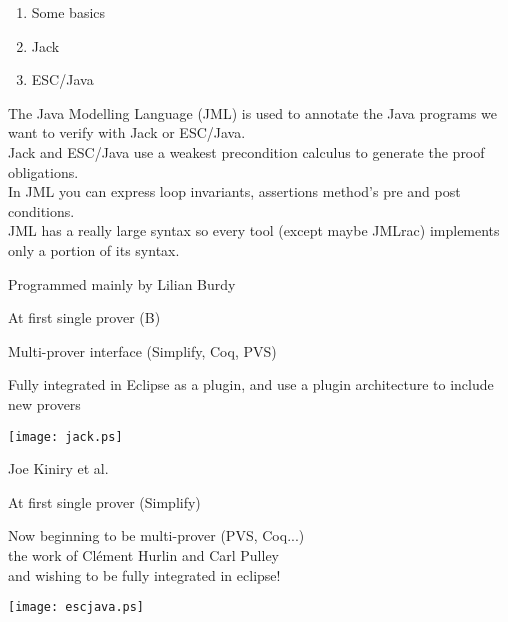 \begin{enumerate}
\item Some basics
\item Jack
\item ESC/Java
\end{enumerate}

\small
The {\purple Java Modelling Language} (JML)
is used to annotate the Java programs we want to verify with 
Jack or ESC/Java.\\
Jack and ESC/Java use a {\purple weakest precondition calculus} to generate
the proof obligations.\\
In JML you can express loop invariants, assertions method's
pre and post conditions.\\
JML has a really large syntax so every tool (except maybe JMLrac)
implements only a {\purple portion} of its syntax.


\small
\blist
\item Programmed mainly by Lilian Burdy
\item At first single prover (B)
\item Multi-prover interface (Simplify, Coq, PVS)
\item Fully integrated in {\purple Eclipse} as a plugin, and use a 
{\purple plugin architecture} to include new provers
\elist
\begin{center}
\texttt{[image: jack.ps]}
\end{center}
\small
\blist
\item Joe Kiniry et al.
\item At first single prover (Simplify)
\item Now beginning to be multi-prover   (PVS, Coq...)\\
  \rarrow the work of Cl\'ement Hurlin and Carl Pulley\\
and wishing to be fully integrated in eclipse!
\elist
\begin{center}
  \texttt{[image: escjava.ps]}
\end{center}

